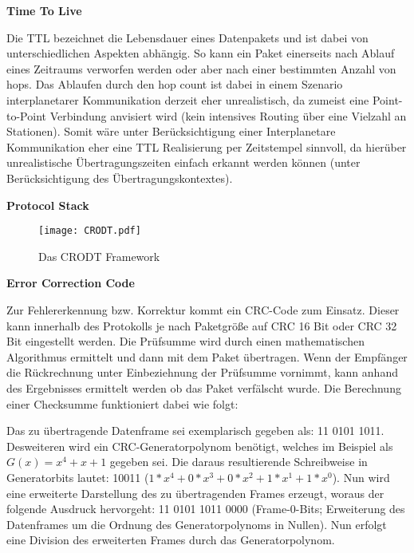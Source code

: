 \label{sec:Vorueberlegung}

\textbf{Time To Live}

Die TTL bezeichnet die Lebensdauer eines Datenpakets und ist dabei von
unterschiedlichen Aspekten abh{\"a}ngig. So kann ein Paket einerseits nach
Ablauf eines Zeitraums verworfen werden oder aber nach einer bestimmten Anzahl
von hops. Das Ablaufen durch den hop count ist dabei in einem Szenario
interplanetarer Kommunikation derzeit eher unrealistisch, da zumeist eine
Point-to-Point Verbindung anvisiert wird (kein intensives Routing {\"u}ber eine
Vielzahl an Stationen). Somit w{\"a}re unter Ber{\"u}cksichtigung einer
Interplanetare Kommunikation eher eine TTL Realisierung per Zeitstempel
sinnvoll, da hier{\"u}ber unrealistische {\"U}bertragungszeiten einfach erkannt
werden k{\"o}nnen (unter Ber{\"u}cksichtigung des {\"U}bertragungskontextes).

\textbf{Protocol Stack}

\begin{figure}[H]
\centering
\texttt{[image: CRODT.pdf]}
\caption{Das CRODT Framework}
\label{fig:CRODT}
\end{figure}

\textbf{Error Correction Code}

Zur Fehlererkennung bzw. Korrektur kommt ein CRC-Code zum Einsatz. Dieser kann
innerhalb des Protokolls je nach Paketgr{\"o}{\ss}e auf CRC 16 Bit oder CRC 32
Bit eingestellt werden. Die Pr{\"u}fsumme wird durch einen mathematischen
Algorithmus ermittelt und dann mit dem Paket {\"u}bertragen. Wenn der
Empf{\"a}nger die R{\"u}ckrechnung unter Einbeziehnung der Pr{\"u}fsumme
vornimmt, kann anhand des Ergebnisses ermittelt werden ob das Paket
verf{\"a}lscht wurde. Die Berechnung einer Checksumme funktioniert dabei wie
folgt:

Das zu {\"u}bertragende Datenframe sei exemplarisch gegeben als: 11 0101 1011.
Desweiteren wird ein CRC-Generatorpolynom ben{\"o}tigt, welches im Beispiel als
$G(x) = x^4 + x + 1$ gegeben sei. Die daraus resultierende Schreibweise in Generatorbits lautet: 10011
($1*x^4+0*x^3+0*x^2+1*x^1+1*x^0$).
Nun wird eine erweiterte Darstellung des zu {\"u}bertragenden Frames erzeugt,
woraus der folgende Ausdruck hervorgeht: 11 0101 1011 0000
(Frame-0-Bits; Erweiterung des Datenframes um die Ordnung des Generatorpolynoms in Nullen). Nun erfolgt eine
Division des erweiterten Frames durch das Generatorpolynom.

\makeatletter
\def\cline#1{\noalign{\vskip-2ex}\@cline#1\@nil}
\makeatother

